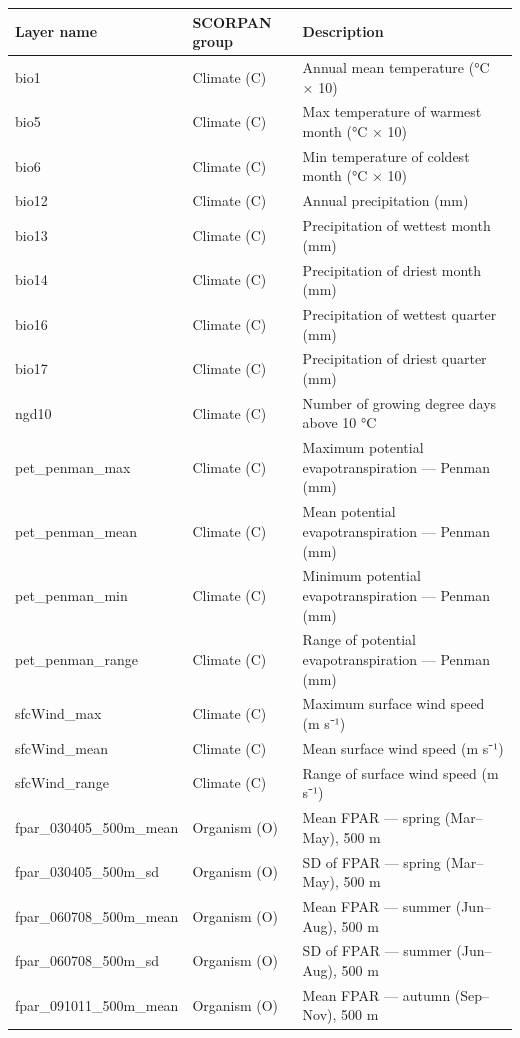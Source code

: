 \documentclass[
  10pt,
  b5paper,
  oneside]{book}
\begin{document}
\begin{tabular}{l|l|l}
\hline
Layer name & SCORPAN group & Description\\
\hline
bio1 & Climate (C) & Annual mean temperature (°C × 10)\\
\hline
bio5 & Climate (C) & Max temperature of warmest month (°C × 10)\\
\hline
bio6 & Climate (C) & Min temperature of coldest month (°C × 10)\\
\hline
bio12 & Climate (C) & Annual precipitation (mm)\\
\hline
bio13 & Climate (C) & Precipitation of wettest month (mm)\\
\hline
bio14 & Climate (C) & Precipitation of driest month (mm)\\
\hline
bio16 & Climate (C) & Precipitation of wettest quarter (mm)\\
\hline
bio17 & Climate (C) & Precipitation of driest quarter (mm)\\
\hline
ngd10 & Climate (C) & Number of growing degree days above 10 °C\\
\hline
pet\_penman\_max & Climate (C) & Maximum potential evapotranspiration — Penman (mm)\\
\hline
pet\_penman\_mean & Climate (C) & Mean potential evapotranspiration — Penman (mm)\\
\hline
pet\_penman\_min & Climate (C) & Minimum potential evapotranspiration — Penman (mm)\\
\hline
pet\_penman\_range & Climate (C) & Range of potential evapotranspiration — Penman (mm)\\
\hline
sfcWind\_max & Climate (C) & Maximum surface wind speed (m s⁻¹)\\
\hline
sfcWind\_mean & Climate (C) & Mean surface wind speed (m s⁻¹)\\
\hline
sfcWind\_range & Climate (C) & Range of surface wind speed (m s⁻¹)\\
\hline
fpar\_030405\_500m\_mean & Organism (O) & Mean FPAR — spring (Mar–May), 500 m\\
\hline
fpar\_030405\_500m\_sd & Organism (O) & SD of FPAR — spring (Mar–May), 500 m\\
\hline
fpar\_060708\_500m\_mean & Organism (O) & Mean FPAR — summer (Jun–Aug), 500 m\\
\hline
fpar\_060708\_500m\_sd & Organism (O) & SD of FPAR — summer (Jun–Aug), 500 m\\
\hline
fpar\_091011\_500m\_mean & Organism (O) & Mean FPAR — autumn (Sep–Nov), 500 m\\

\end{tabular}
\end{document}

